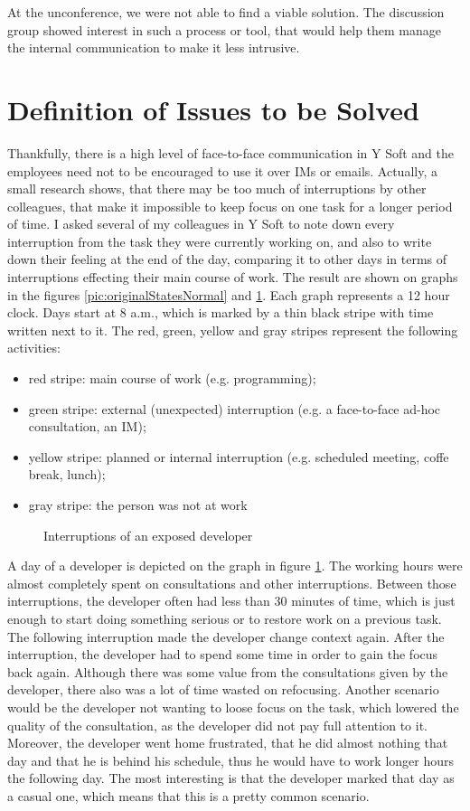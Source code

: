\documentclass[11pt,singleside]{myfithesis2}
\newcommand{\pict}[4]{
	\begin{figure}[h!]
  		\vspace{-7px}
  		\centerline{\fcolorbox{darkgray}{palegray}{\texttt{[image: \#2]}}}
  		\caption{#1}
  		\label{#4}
	\end{figure}
}
\begin{document}
At the unconference, we were not able to find a viable solution. The discussion group showed interest in such a process or tool, that would help them manage the internal communication to make it less intrusive.


	\section{Definition of Issues to be Solved}\label{issues}
Thankfully, there is a high level of face-to-face communication in Y Soft and the employees need not to be encouraged to use it over IMs or emails. Actually, a small research shows, that there may be too much of interruptions by other colleagues, that make it impossible to keep focus on one task for a longer period of time. I asked several of my colleagues in Y Soft to note down every interruption from the task they were currently working on, and also to write down their feeling at the end of the day, comparing it to other days in terms of interruptions effecting their main course of work. The result are shown on graphs in the figures \ref{pic:originalStatesNormal} and \ref{pic:originalStatesExposed}. Each graph represents a 12 hour clock. Days start at 8 a.m., which is marked by a thin black stripe with time written next to it. The red, green, yellow and gray stripes represent the following activities:
\begin{itemize}
	\item{red stripe:} main course of work (e.g. programming);
	\item{green stripe:} external (unexpected) interruption (e.g. a face-to-face ad-hoc consultation, an IM);
	\item{yellow stripe:} planned or internal interruption (e.g. scheduled meeting, coffe break, lunch);
	\item{gray stripe:} the person was not at work
\end{itemize}

\pict{Interruptions of an exposed developer}{data/originalStatesExposed.png}{width=0.8\textwidth}{pic:originalStatesExposed}

A day of a developer is depicted on the graph in figure \ref{pic:originalStatesExposed}. The working hours were almost completely spent on consultations and other interruptions. Between those interruptions, the developer often had less than 30 minutes of time, which is just enough to start doing something serious or to restore work on a previous task. The following interruption made the developer change context again. After the interruption, the developer had to spend some time in order to gain the focus back again. Although there was some value from the consultations given by the developer, there also was a lot of time wasted on refocusing. Another scenario would be the developer not wanting to loose focus on the task, which lowered the quality of the consultation, as the developer did not pay full attention to it. Moreover, the developer went home frustrated, that he did almost nothing that day and that he is behind his schedule, thus he would have to work longer hours the following day. The most interesting is that the developer marked that day as a casual one, which means that this is a pretty common scenario.
\end{document}
